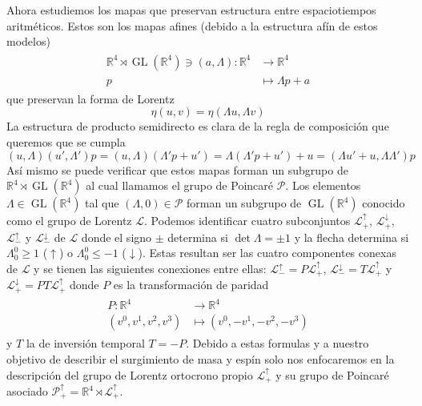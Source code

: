 \documentclass[11pt]{article}
\DeclareMathOperator{\Gl}{GL}
\begin{document}
Ahora estudiemos los mapas que preservan estructura entre espaciotiempos aritméticos. Estos son los mapas afines (debido a la estructura afín de estos modelos)
\begin{align}
\begin{split}
\mathbb{R}^4\rtimes \Gl(\mathbb{R}^4)\ni(a,\Lambda):\mathbb{R}^4&\rightarrow\mathbb{R}^4 \\
p&\mapsto\Lambda p + a
\end{split}
\end{align}
que preservan la forma de Lorentz
\begin{equation}
\eta(u,v)=\eta(\Lambda u,\Lambda v)
\end{equation}
La estructura de producto semidirecto es clara de la regla de composición que queremos que se cumpla
\begin{equation}
(u,\Lambda)(u',\Lambda')p=(u,\Lambda)(\Lambda 'p+u')=\Lambda(\Lambda 'p+u')+u=(\Lambda u'+u,\Lambda\Lambda ')p
\end{equation} 
Así mismo se puede verificar que estos mapas forman un subgrupo de $\mathbb{R}^4\rtimes\Gl(\mathbb{R}^4)$ al cual llamamos el grupo de Poincaré $\mathcal{P}$. Los elementos $\Lambda\in\Gl(\mathbb{R}^4)$ tal que $(\Lambda,0)\in\mathcal{P}$ forman un subgrupo de $\Gl(\mathbb{R}^4)$ conocido como el grupo de Lorentz $\mathcal{L}$. Podemos identificar cuatro subconjuntos $\mathcal{L}_+^\uparrow$, $\mathcal{L}_+^\downarrow$, $\mathcal{L}_-^\uparrow$ y $\mathcal{L}_-^\downarrow$ de $\mathcal{L}$ donde el signo $\pm$ determina si $\det\Lambda=\pm 1$ y la flecha determina si $\Lambda^0_0\geq 1$ ($\uparrow$) o $\Lambda^0_0\leq -1$ ($\downarrow$). Estas resultan ser las cuatro componentes conexas de $\mathcal{L}$ y se tienen las siguientes conexiones entre ellas: $\mathcal{L}_-^\uparrow=P\mathcal{L}_+^\uparrow$, $\mathcal{L}_-^\downarrow=T\mathcal{L}_+^\uparrow$ y $\mathcal{L}_+^\downarrow=PT\mathcal{L}_+^\uparrow$ donde $P$ es la transformación de paridad
\begin{align}
\begin{split}
P:\mathbb{R}^4&\rightarrow\mathbb{R}^4 \\
(v^0,v^1,v^2,v^3)&\mapsto(v^0,-v^1,-v^2,-v^3)
\end{split}
\end{align}
y $T$ la de inversión temporal $T=-P$. Debido a estas formulas y a nuestro objetivo de describir el surgimiento de masa y espín solo nos enfocaremos en la descripción del grupo de Lorentz ortocrono propio $\mathcal{L}_+^\uparrow$ y su grupo de Poincaré asociado $\mathcal{P}_+^\uparrow=\mathbb{R}^4\rtimes\mathcal{L}_+^\uparrow$.
\end{document}
